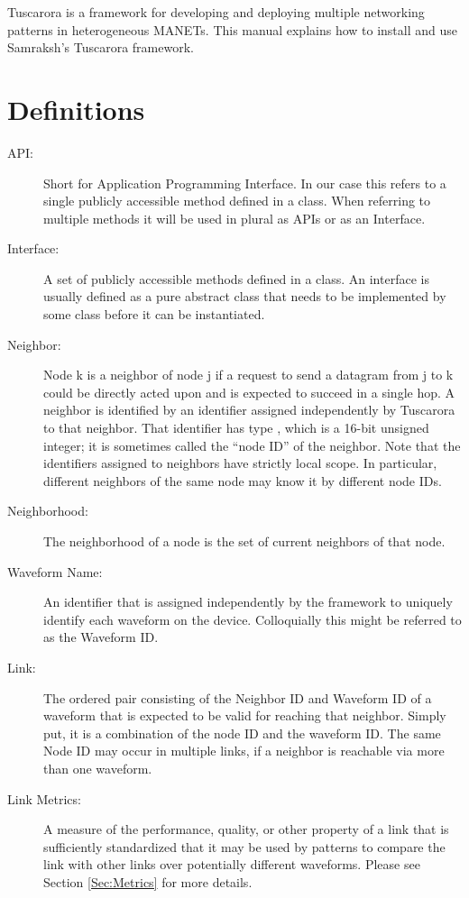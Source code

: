 
Tuscarora is a framework for developing and deploying multiple networking patterns in heterogeneous MANETs.
This manual explains how to install and use Samraksh's Tuscarora framework. 

\section{Definitions}

\begin{description}
\item [API:] Short for Application Programming Interface. In our case
  this refers to a single publicly accessible method defined in a
  class. When referring to multiple methods it will be used in plural
  as APIs or as an Interface.

\item [Interface:] A set of publicly accessible methods defined in a
  class. An interface is usually defined as a pure abstract class
  that needs to be implemented by some class before it can be
  instantiated.

\item [Neighbor:] Node k is a neighbor of node j if a request to send
  a datagram from j to k could be directly acted upon and is expected
  to succeed in a single hop. A neighbor is identified by an
  identifier assigned independently by Tuscarora to that neighbor.
  That identifier has type , which is a 16-bit unsigned integer;
  it is sometimes called the ``node ID'' of the neighbor.  Note that the
  identifiers assigned to neighbors have strictly local scope.  In
  particular, different neighbors of the same node may know it by
  different node IDs. 

\item [Neighborhood:] The neighborhood of a node is the set of
  current neighbors of that node.

\item [Waveform Name:] An identifier that is assigned independently
  by the framework to uniquely identify each waveform on the
  device. Colloquially this might be referred to as the Waveform ID.

\item [Link:] The ordered pair consisting of the Neighbor ID and
  Waveform ID of a waveform that is expected to be valid for reaching
  that neighbor. Simply put, it is a combination of the node ID and the
  waveform ID.  The same Node ID may occur in multiple links, if a
  neighbor is reachable via more than one waveform.

\item [Link Metrics:] A measure of the performance, quality, or other
  property of a link that is sufficiently standardized that it may be
  used by patterns to compare the link with other links over
  potentially different waveforms. Please see Section
  \ref{Sec:Metrics} for more details.
\end{description}

